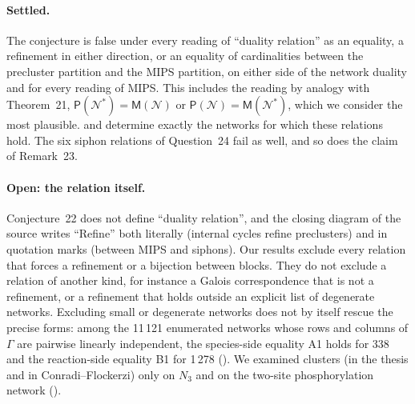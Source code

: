 \documentclass[11pt,a4paper]{report}
\newcommand{\Net}{\mathcal{N}}
\newcommand{\Pre}{\mathsf{P}}
\newcommand{\Mips}{\mathsf{M}}
\begin{document}
\paragraph{Settled.} The conjecture is false under every reading of ``duality relation'' as an equality, a refinement
in either direction, or an equality of cardinalities between the precluster partition and the MIPS partition, on
either side of the network duality and for every reading of MIPS. This includes the reading by analogy with
Theorem~21, \(\Pre(\Net^*)=\Mips(\Net)\) or \(\Pre(\Net)=\Mips(\Net^*)\), which we consider the most plausible.
 and  determine exactly the networks for which these relations hold. The six
siphon relations of Question~24 fail as well, and so does the claim of Remark~23.

\paragraph{Open: the relation itself.} Conjecture~22 does not define ``duality relation'', and the closing diagram
of the source writes ``Refine'' both literally (internal cycles refine preclusters) and in quotation marks (between
MIPS and siphons). Our results exclude every relation that forces a refinement or a bijection between blocks. They do
not exclude a relation of another kind, for instance a Galois correspondence that is not a refinement, or a
refinement that holds outside an explicit list of degenerate networks. Excluding small or degenerate networks does
not by itself rescue the precise forms: among the 11\,121 enumerated networks whose rows and columns of \(\Gamma\) are
pairwise linearly independent, the species-side equality A1 holds for 338 and the reaction-side equality B1 for
1\,278 (). We examined clusters (in the thesis and in Conradi--Flockerzi) only on \(N_3\) and on the
two-site phosphorylation network ().
\end{document}
